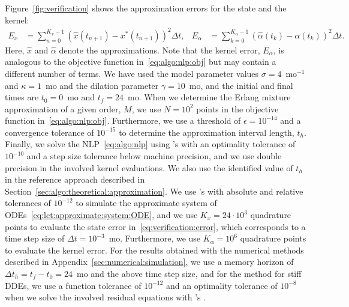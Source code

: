 Figure~\ref{fig:verification} shows the approximation errors for the state and the kernel:
%
\begin{align}\label{eq:verification:error}
	E_x &= \sum_{n=0}^{K_x-1} (\hat x(t_{n+1}) - x^*(t_{n+1}))^2 \Delta t, &
	E_\alpha &= \sum_{k=0}^{K_\alpha-1} (\hat \alpha(t_k) - \alpha(t_k))^2 \Delta t.
\end{align}
%
Here, $\hat x$ and $\hat \alpha$ denote the approximations. Note that the kernel error, $E_\alpha$, is analogous to the objective function in~\eqref{eq:algo:nlp:obj} but may contain a different number of terms. We have used the model parameter values $\sigma = 4$~mo$^{-1}$ and $\kappa = 1$~mo and the dilation parameter $\gamma = 10$~mo, and the initial and final times are $t_0 = 0$~mo and $t_f = 24$~mo. When we determine the Erlang mixture approximation of a given order, $M$, we use $N = 10^2$ points in the objective function in~\eqref{eq:algo:nlp:obj}. Furthermore, we use a threshold of $\epsilon = 10^{-14}$ and a convergence tolerance of $10^{-15}$ to determine the approximation interval length, $t_h$. Finally, we solve the NLP~\eqref{eq:algo:nlp} using \matlab{}'s \fmincon{} with an optimality tolerance of $10^{-10}$ and a step size tolerance below machine precision, and we use double precision in the involved kernel evaluations. We also use the identified value of $t_h$ in the reference approach described in Section~\ref{sec:algo:theoretical:approximation}.
%
We use \matlab{}'s \odeff{} with absolute and relative tolerances of $10^{-12}$ to simulate the approximate system of ODEs~\eqref{eq:lct:approximate:system:ODE}, and we use $K_x = 24\cdot 10^3$ quadrature points to evaluate the state error in~\eqref{eq:verification:error}, which corresponds to a time step size of $\Delta t = 10^{-3}$~mo. Furthermore, we use $K_\alpha = 10^6$ quadrature points to evaluate the kernel error.
%
For the results obtained with the numerical methods described in Appendix~\ref{sec:numerical:simulation}, we use a memory horizon of $\Delta t_h = t_f - t_0 = 24$~mo and the above time step size, and for the method for stiff DDEs, we use a function tolerance of $10^{-12}$ and an optimality tolerance of $10^{-8}$ when we solve the involved residual equations with \matlab{}'s \fsolve{}.

